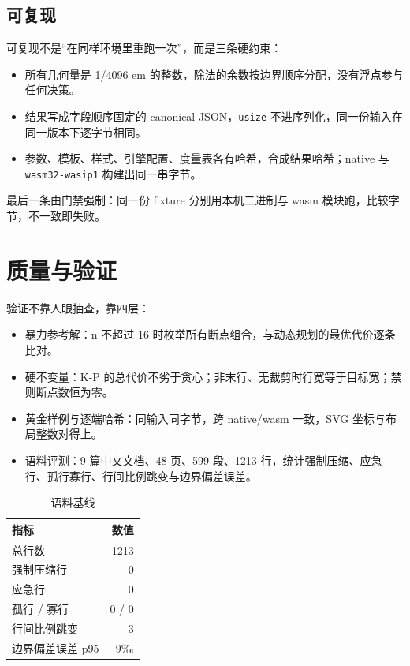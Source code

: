 \documentclass{article}
\begin{document}
\subsection{可复现}

可复现不是“在同样环境里重跑一次”，而是三条硬约束：

\begin{itemize}
\item 所有几何量是 1/4096 em 的整数，除法的余数按边界顺序分配，没有浮点参与任何决策。
\item 结果写成字段顺序固定的 canonical JSON，\texttt{usize} 不进序列化，同一份输入在同一版本下逐字节相同。
\item 参数、模板、样式、引擎配置、度量表各有哈希，合成结果哈希；native 与 \texttt{wasm32-wasip1} 构建出同一串字节。
\end{itemize}

最后一条由门禁强制：同一份 fixture 分别用本机二进制与 wasm 模块跑，比较字节，不一致即失败。

\section{质量与验证}

验证不靠人眼抽查，靠四层：

\begin{itemize}
\item 暴力参考解：n 不超过 16 时枚举所有断点组合，与动态规划的最优代价逐条比对。
\item 硬不变量：K-P 的总代价不劣于贪心；非末行、无裁剪时行宽等于目标宽；禁则断点数恒为零。
\item 黄金样例与逐端哈希：同输入同字节，跨 native/wasm 一致，SVG 坐标与布局整数对得上。
\item 语料评测：9 篇中文文档、48 页、599 段、1213 行，统计强制压缩、应急行、孤行寡行、行间比例跳变与边界偏差误差。
\end{itemize}

\begin{table}
\caption{语料基线}
\begin{tabular}{lr}
\hline
指标 & 数值 \\
\hline
总行数 & 1213 \\
强制压缩行 & 0 \\
应急行 & 0 \\
孤行 / 寡行 & 0 / 0 \\
行间比例跳变 & 3 \\
边界偏差误差 p95 & 9‰ \\
\hline
\end{tabular}
\end{table}
\end{document}
